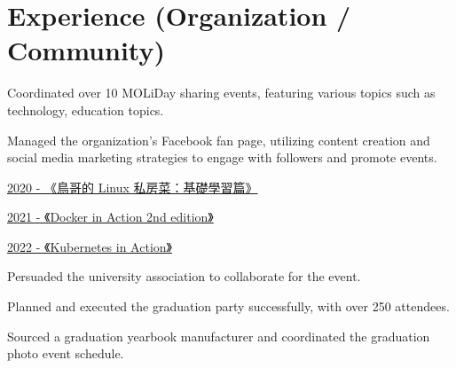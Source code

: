 \documentclass[]{deedy-resume-openfont}
\begin{document}
\hfill
\begin{minipage}[t]{1\textwidth}


\section{Experience (Organization / Community)}
\null\hfill{}
\vspace{\topsep}
\begin{tightemize}
    \item Coordinated over 10 MOLiDay sharing events, featuring various topics such as technology, education topics.
    \item Managed the organization's Facebook fan page, utilizing content creation and social media marketing strategies to engage with followers and promote events.
\end{tightemize}
\hspace{12pt}
\sectionsep


\null\hfill{}
\begin{tightemize}
    \item {}\href{https://lsa.moli.rocks/study-circle/docs/2020-11-07}{2020 - 《鳥哥的 Linux 私房菜：基礎學習篇》}
    \item {}\href{https://lsa.moli.rocks/study-circle/docs/docker-1}{2021 - 《Docker in Action 2nd edition》}
    \item {}\href{https://lsa.moli.rocks/study-circle/docs/k8s-1}{2022 - 《Kubernetes in Action》}
\end{tightemize}
\sectionsep

\null\hfill{}
\begin{tightemize}
    \item Persuaded the university association to collaborate for the event.
    \item Planned and executed the graduation party successfully, with over 250 attendees.
    \item Sourced a graduation yearbook manufacturer and coordinated the graduation photo event schedule.
\end{tightemize}
\sectionsep


\end{minipage}
\end{document}
